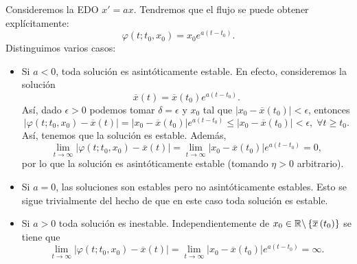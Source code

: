 \begin{eg}
Consideremos la EDO $\displaystyle x' = ax $. Tendremos que el flujo se puede obtener explícitamente:
\[\varphi\left(t; t_{0}, x_{0}\right)=x_{0}e^{a\left(t-t_{0}\right)} .\]
Distinguimos varios casos:
\begin{itemize}
\item Si $\displaystyle a < 0 $, toda solución es asintóticamente estable. En efecto, consideremos la solución 
	\[ \overline{x}\left(t\right)= \overline{x}\left(t_{0}\right)e^{a\left(t-t_{0}\right)} .\]
	Así, dado $\displaystyle \epsilon > 0 $ podemos tomar $\displaystyle \delta = \epsilon  $ y $\displaystyle x_{0} $ tal que $\displaystyle \left|x_{0} - \overline{x}\left(t_{0}\right)\right|< \epsilon  $, entonces
	\[ \left|\varphi\left(t; t_{0}, x_{0}\right)-\overline{x}\left(t\right)\right|= \left|x_{0}-\overline{x}\left(t_{0}\right)\right|e^{a\left(t-t_{0}\right)} \leq \left|x_{0}-\overline{x}\left(t_{0}\right)\right|<\epsilon  , \; \forall t \geq t_{0}.\]
	Así, tenemos que la solución es estable. Además, 
	\[\lim_{t \to \infty} \left|\varphi\left(t; t_{0}, x_{0}\right)-\overline{x}\left(t\right)\right| = \lim_{t \to \infty } \left|x_{0}-\overline{x}\left(t_{0}\right)\right|e^{a\left(t-t_{0}\right)} = 0 ,\]
	por lo que la solución es asintóticamente estable (tomando $\displaystyle \eta > 0 $ arbitrario).
\item Si $\displaystyle a = 0 $, las soluciones son estables pero no asintóticamente estables. Esto se sigue trivialmente del hecho de que en este caso toda solución es estable. 
\item Si $\displaystyle a > 0 $ toda solución es inestable. Independientemente de $\displaystyle x_{0} \in \mathbb{R} \backslash \left\{ \overline{x}\left(t_{0}\right)\right\}  $ se tiene que 
	\[\lim_{t \to \infty } \left|\varphi\left(t; t_{0}, x_{0}\right)-\overline{x}\left(t\right)\right| = \lim_{t \to \infty } \left|x_{0}-\overline{x}\left(t_{0}\right)\right|e^{a\left(t-t_{0}\right)} = \infty  .\]
\end{itemize}
\end{eg}

